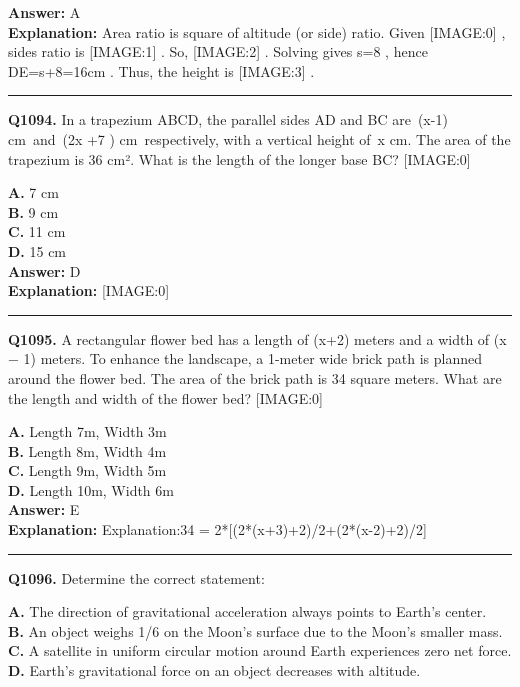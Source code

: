 \documentclass[12pt]{article}
\begin{document}
\textbf{Answer:} A \\
\textbf{Explanation:} Area ratio is square of altitude (or side) ratio. Given
[IMAGE:0]
, sides ratio is
[IMAGE:1]
. So,
[IMAGE:2]
. Solving gives s=8
, hence DE=s+8=16cm
. Thus, the height is
[IMAGE:3]
.

\hrule
\vspace{1em}


\noindent
\textbf{Q1094.} In a trapezium ABCD, the parallel sides AD and BC are (x-1)
cm and (2x
+7
)
cm respectively, with a vertical height of x
cm. The area of the trapezium is 36 cm². What is the length of the longer base BC?
[IMAGE:0]



\textbf{A.} 7 cm \\
\textbf{B.} 9 cm \\
\textbf{C.} 11 cm \\
\textbf{D.} 15 cm \\

\textbf{Answer:} D \\
\textbf{Explanation:} [IMAGE:0]

\hrule
\vspace{1em}


\noindent
\textbf{Q1095.} A rectangular flower bed has a length of (x+2) meters and a width of (x
−
1) meters. To enhance the landscape, a 1-meter wide brick path is planned around the flower bed. The area of the brick path is 34 square meters. What are the length and width of the flower bed?
[IMAGE:0]



\textbf{A.} Length 7m, Width 3m \\
\textbf{B.} Length 8m, Width 4m \\
\textbf{C.} Length 9m, Width 5m \\
\textbf{D.} Length 10m, Width 6m \\

\textbf{Answer:} E \\
\textbf{Explanation:} Explanation:34 = 2*[(2*(x+3)+2)/2+(2*(x-2)+2)/2]

\hrule
\vspace{1em}


\noindent
\textbf{Q1096.} Determine the correct statement:



\textbf{A.} The direction of gravitational acceleration always points to Earth’s center. \\
\textbf{B.} An object weighs 1/6 on the Moon’s surface due to the Moon’s smaller mass. \\
\textbf{C.} A satellite in uniform circular motion around Earth experiences zero net force. \\
\textbf{D.} Earth’s gravitational force on an object decreases with altitude. \\
\end{document}
